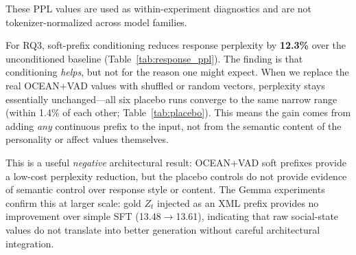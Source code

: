 \documentclass[11pt]{article}
\begin{document}
\begin{table}[t]
\centering
\caption{Response generation comparison. \textbf{Bold}: best PPL. The soft-prefix gain is $12.3\%$, but placebo ablations show this gain is not attributable to the semantic content of OCEAN+VAD values. ConditionalDialogue reports mean across 3 seeds (42--44).}
\label{tab:response_ppl}
\small
{}
\end{table}

These PPL values are used as within-experiment diagnostics and are not tokenizer-normalized across model families.

For RQ3, soft-prefix conditioning reduces response perplexity by \textbf{12.3\%} over the unconditioned baseline (Table~\ref{tab:response_ppl}).
The finding is that conditioning \textit{helps}, but not for the reason one might expect.
When we replace the real OCEAN+VAD values with shuffled or random vectors, perplexity stays essentially unchanged---all six placebo runs converge to the same narrow range (within 1.4\% of each other; Table~\ref{tab:placebo}).
This means the gain comes from adding \textit{any} continuous prefix to the input, not from the semantic content of the personality or affect values themselves.

This is a useful \textit{negative} architectural result: OCEAN+VAD soft prefixes provide a low-cost perplexity reduction, but the placebo controls do not provide evidence of semantic control over response style or content.
The Gemma experiments confirm this at larger scale: gold $Z_t$ injected as an XML prefix provides no improvement over simple SFT (13.48$\to$13.61), indicating that raw social-state values do not translate into better generation without careful architectural integration.
\end{document}
